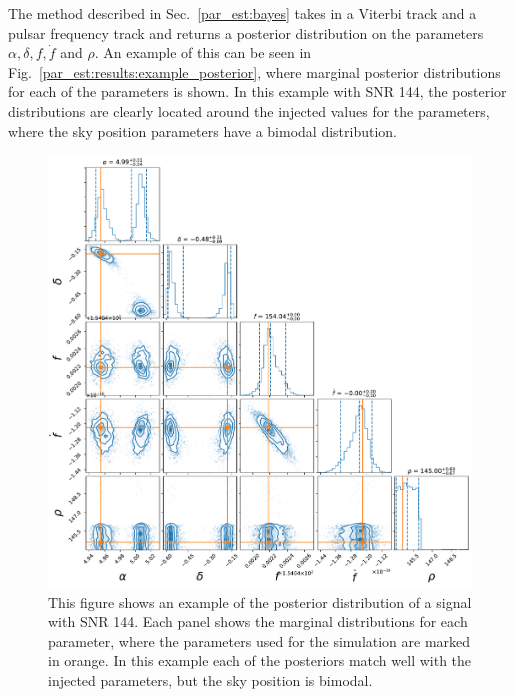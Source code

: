 The method described in Sec.~\ref{par_est:bayes} takes in a Viterbi track and a pulsar frequency track and returns a posterior distribution on the parameters $\alpha, \delta, f, \dot{f}$ and $\rho$.
An example of this can be seen in Fig.~\ref{par_est:results:example_posterior}, where marginal posterior distributions for each of the parameters is shown.
In this example with \gls{SNR} 144, the posterior distributions are clearly located around the injected values for the parameters, where the sky position parameters have a bimodal distribution.
%
\begin{figure}[pt]

    \centering
    \includegraphics[width=\linewidth]{C5_parameter/cornerplot.pdf}
    \caption[KDE of likelihood in different \gls{SNR} ranges]{This figure shows an example of the posterior distribution of a signal with \gls{SNR} 144. Each panel shows the marginal distributions for each parameter, where the parameters used for the simulation are marked in orange. In this example each of the posteriors match well with the injected parameters, but the sky position is bimodal. }
    \label{par_est:results:example_posterier}
    
\end{figure}
%

